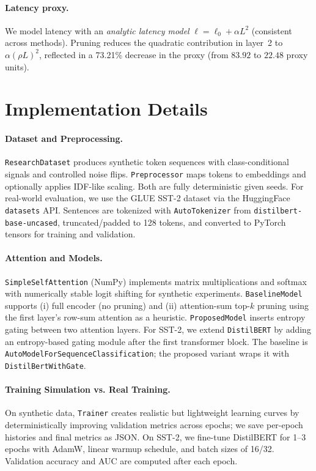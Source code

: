 \documentclass{article}
\newcommand{\latred}{73.21\%}    %
\newcommand{\Lseq}{L}
\begin{document}
\paragraph{Latency proxy.}
We model latency with an \emph{analytic latency model} $\ell = \ell_0 + \alpha \Lseq^2$ (consistent across methods). Pruning reduces the quadratic contribution in layer~2 to $\alpha(\rho\Lseq)^2$, reflected in a \latred{} decrease in the proxy (from $83.92$ to $22.48$ proxy units).

\section{Implementation Details}
\label{sec:impl}

\paragraph{Dataset and Preprocessing.}
\texttt{ResearchDataset} produces synthetic token sequences with class-conditional signals and controlled noise flips. \texttt{Preprocessor} maps tokens to embeddings and optionally applies IDF-like scaling. Both are fully deterministic given seeds.  
For real-world evaluation, we use the GLUE SST-2 dataset via the HuggingFace \texttt{datasets} API. Sentences are tokenized with \texttt{AutoTokenizer} from \texttt{distilbert-base-uncased}, truncated/padded to 128 tokens, and converted to PyTorch tensors for training and validation.

\paragraph{Attention and Models.}
\texttt{SimpleSelfAttention} (NumPy) implements matrix multiplications and softmax with numerically stable logit shifting for synthetic experiments. \texttt{BaselineModel} supports (i) full encoder (no pruning) and (ii) attention-sum top-$k$ pruning using the first layer’s row-sum attention as a heuristic. \texttt{ProposedModel} inserts entropy gating between two attention layers.  
For SST-2, we extend \texttt{DistilBERT} by adding an entropy-based gating module after the first transformer block. The baseline is \texttt{AutoModelForSequenceClassification}; the proposed variant wraps it with \texttt{DistilBertWithGate}.

\paragraph{Training Simulation vs. Real Training.}
On synthetic data, \texttt{Trainer} creates realistic but lightweight learning curves by deterministically improving validation metrics across epochs; we save per-epoch histories and final metrics as JSON.  
On SST-2, we fine-tune DistilBERT for 1--3 epochs with AdamW, linear warmup schedule, and batch sizes of 16/32. Validation accuracy and AUC are computed after each epoch.
\end{document}
